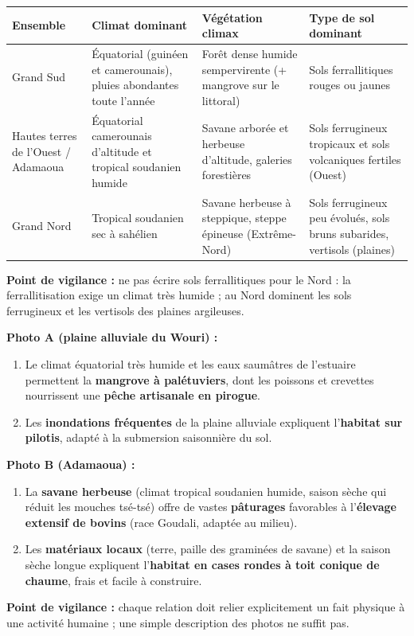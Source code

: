 \documentclass[11pt]{article}
\begin{document}
\begin{corrige}
\begin{center}
\begin{tabularx}{\linewidth}{|l|X|X|X|}\hline
\rowcolor{popblueL}\textbf{Ensemble} & \textbf{Climat dominant} & \textbf{Végétation climax} & \textbf{Type de sol dominant} \\ \hline
Grand Sud & Équatorial (guinéen et camerounais), pluies abondantes toute l'année & Forêt dense humide sempervirente (+ mangrove sur le littoral) & Sols ferrallitiques rouges ou jaunes \\ \hline
Hautes terres de l'Ouest / Adamaoua & Équatorial camerounais d'altitude et tropical soudanien humide & Savane arborée et herbeuse d'altitude, galeries forestières & Sols ferrugineux tropicaux et sols volcaniques fertiles (Ouest) \\ \hline
Grand Nord & Tropical soudanien sec à sahélien & Savane herbeuse à steppique, steppe épineuse (Extrême-Nord) & Sols ferrugineux peu évolués, sols bruns subarides, vertisols (plaines) \\ \hline
\end{tabularx}
\end{center}
\textbf{Point de vigilance :} ne pas écrire \og sols ferrallitiques \fg pour le Nord : la ferrallitisation exige un climat très humide ; au Nord dominent les sols ferrugineux et les vertisols des plaines argileuses.
\end{corrige}

\begin{corrige}
\textbf{Photo A (plaine alluviale du Wouri) :}
\begin{enumerate}
\item Le climat équatorial très humide et les eaux saumâtres de l'estuaire permettent la \textbf{mangrove à palétuviers}, dont les poissons et crevettes nourrissent une \textbf{pêche artisanale en pirogue}.
\item Les \textbf{inondations fréquentes} de la plaine alluviale expliquent l'\textbf{habitat sur pilotis}, adapté à la submersion saisonnière du sol.
\end{enumerate}
\textbf{Photo B (Adamaoua) :}
\begin{enumerate}
\item La \textbf{savane herbeuse} (climat tropical soudanien humide, saison sèche qui réduit les mouches tsé-tsé) offre de vastes \textbf{pâturages} favorables à l'\textbf{élevage extensif de bovins} (race Goudali, adaptée au milieu).
\item Les \textbf{matériaux locaux} (terre, paille des graminées de savane) et la saison sèche longue expliquent l'\textbf{habitat en cases rondes à toit conique de chaume}, frais et facile à construire.
\end{enumerate}
\textbf{Point de vigilance :} chaque relation doit relier explicitement un fait physique à une activité humaine ; une simple description des photos ne suffit pas.
\end{corrige}
\end{document}
